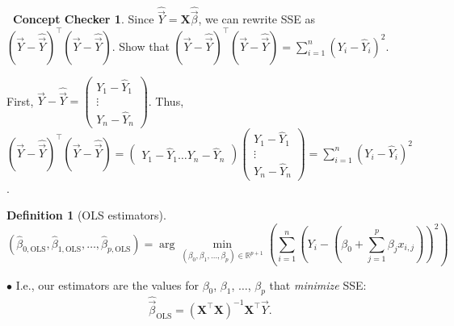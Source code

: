 \documentclass[12pt,oneside]{article}
\newcommand{\OLS}{\text{OLS}}
\newcommand{\R}{\mathbb{R}}
\theoremstyle{definition}
\newtheorem{definition}{Definition}
\newtheorem{concept}{\faPen \ Concept Checker}
\theoremstyle{remark}
\begin{document}
\begin{concept}
Since $\widehat{\vec{Y}} = \boldsymbol{X} \widehat{\vec{\beta}}$, we can rewrite SSE as $(\vec{Y} - \widehat{\vec{Y}})^{\top} (\vec{Y} - \widehat{\vec{Y}})$. Show that $(\vec{Y} - \widehat{\vec{Y}})^{\top} (\vec{Y} - \widehat{\vec{Y}}) = \sum_{i = 1}^{n} (Y_i - \hat{Y}_i)^2$.
\end{concept}

\begin{solutionbox}
First, $\vec{Y} - \widehat{\vec{Y}} =
\begin{pmatrix}
Y_1 - \hat{Y}_1 \\
\vdots \\
Y_n - \hat{Y}_n
\end{pmatrix}$.
Thus, $(\vec{Y} - \widehat{\vec{Y}})^{\top} (\vec{Y} - \widehat{\vec{Y}}) = 
\begin{pmatrix}
Y_1 - \hat{Y}_1 \ldots Y_n - \hat{Y}_n
\end{pmatrix}
\begin{pmatrix}
Y_1 - \hat{Y}_1 \\
\vdots \\
Y_n - \hat{Y}_n
\end{pmatrix}
=
\sum_{i = 1}^{n} (Y_i - \hat{Y}_i)^2$.
\end{solutionbox}

\begin{definition}[OLS estimators]
\[(\hat{\beta}_{0, \OLS}, \hat{\beta}_{1, \OLS}, \ldots, \hat{\beta}_{p, \OLS}) = \arg \min_{(\beta_0, \beta_1, \ldots, \beta_p) \in \R^{p + 1}} \left( \sum_{i = 1}^{n} \left( Y_i - (\beta_0 + \sum_{j = 1}^{p} \beta_j x_{i, j}) \right)^2 \right)\]

$\bullet$ I.e., our estimators are the values for $\beta_0$, $\beta_1$, $\ldots$, $\beta_p$ that \textit{minimize} SSE: \[\widehat{\vec{\beta}}_{\OLS} = (\boldsymbol{X}^{\top} \boldsymbol{X})^{-1} \boldsymbol{X}^{\top} \vec{Y}.\]
\end{definition}

\end{document}
